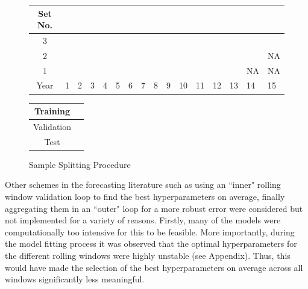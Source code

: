 \documentclass[11pt, a4paper, table]{article}
\begin{document}
\begin{figure}[!htb]
	\begin{center}
		\begin{tabular}{|c|p{0.40cm}p{0.40cm}p{0.40cm}p{0.40cm}p{0.40cm}p{0.40cm}p{0.40cm}p{0.40cm}p{0.40cm}p{0.40cm}p{0.40cm}p{0.40cm}p{0.40cm}p{0.40cm}p{0.40cm}|}
			\hline
			Set No. &&&&&&&&&&&&&&& \\
			\hline
			3 & \cellcolor{cyan} & \cellcolor{cyan} & \cellcolor{cyan} & \cellcolor{cyan} & \cellcolor{cyan} & \cellcolor{cyan} & \cellcolor{cyan} & \cellcolor{cyan} & \cellcolor{cyan} &
			\cellcolor{pink} & \cellcolor{pink} & \cellcolor{pink} & \cellcolor{pink} & \cellcolor{pink} & 	
			\cellcolor{olive} \\
			2 & \cellcolor{cyan} & \cellcolor{cyan} & \cellcolor{cyan} & \cellcolor{cyan} & \cellcolor{cyan} & \cellcolor{cyan} & \cellcolor{cyan} & \cellcolor{cyan} &
			\cellcolor{pink} & \cellcolor{pink} & \cellcolor{pink} & \cellcolor{pink} & \cellcolor{pink} & 	
			\cellcolor{olive} & NA  \\
			1 & \cellcolor{cyan} & \cellcolor{cyan} & \cellcolor{cyan} & \cellcolor{cyan} & \cellcolor{cyan} & \cellcolor{cyan} & \cellcolor{cyan} &
			\cellcolor{pink} & \cellcolor{pink} & \cellcolor{pink} & \cellcolor{pink} & \cellcolor{pink} & 	
			\cellcolor{olive} & NA & NA \\
			\hline
			Year & 1 & 2 & 3 & 4 & 5 & 6 & 7 & 8 & 9 & 10 & 11 & 12 & 13 & 14 & 15\\
			\hline
		\end{tabular}
		\medskip
		\begin{tabular}{|c|p{0.40cm}|}
			\hline
			Training & \cellcolor{cyan} \\
			\hline
			Validation & \cellcolor{pink} \\
			\hline
			Test & \cellcolor{olive} \\
			\hline
		\end{tabular}
	\end{center}
	\caption{Sample Splitting Procedure}
	\label{sample_split_diag}
\end{figure}

Other schemes in the forecasting literature such as using an ``inner" rolling window validation loop to find the best hyperparameters on average, finally aggregating them in an ``outer" loop for a more robust error were considered but not implemented for a variety of reasons. Firstly, many of the models were computationally too intensive for this to be feasible. More importantly, during the model fitting process it was observed that the optimal hyperparameters for the different rolling windows were highly unstable (see Appendix). Thus, this would have made the selection of the best hyperparameters on average across all windows significantly less meaningful.
\end{document}
